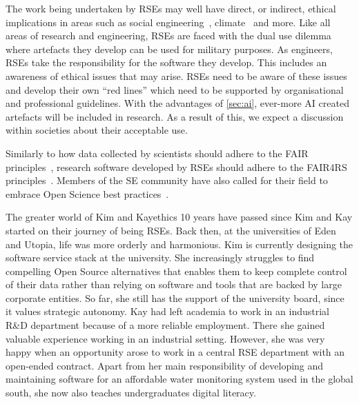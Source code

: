 \documentclass{eceasst}
\begin{document}
The work being undertaken by RSEs may well have direct, or indirect,
ethical implications in areas such as social engineering~\cite{s2erc,Siadati2024},
climate~\cite{Lannelongue2023} and more.
Like all areas of research and engineering, RSEs are faced with the dual use dilemma~\cite{Bobier2024} where artefacts they develop can be used for military purposes.
As engineers, RSEs take the responsibility for the software they develop.
This includes an awareness of ethical issues that may arise.
RSEs need to be aware of these issues and develop their own ``red lines''
which need to be supported by organisational and professional guidelines.
With the advantages of \autoref{sec:ai}, ever-more AI created artefacts will be included in research.
As a result of this, we expect a discussion within societies about their acceptable use.

Similarly to how data collected by scientists should adhere to the FAIR principles~\cite{FAIR},
research software developed by RSEs should adhere to the FAIR4RS principles~\cite{FAIR4RS}.
Members of the SE community have also called for their field to embrace Open Science best practices~\cite{OliveiraJr2024,Druskat2025}.

\begin{story}{The greater world of Kim and Kay}{ethics}
10 years have passed since Kim and Kay started on their journey of being RSEs. Back then,
at the universities of Eden and Utopia, life was more orderly and harmonious.
Kim is currently designing the software service stack at the university.
She increasingly struggles to find compelling Open Source alternatives that enables them to keep complete control of their data
rather than relying on software and tools that are backed by large corporate entities.
So far, she still has the support of the university board, since it values strategic autonomy.
Kay had left academia to work in an industrial R\&D department because of a more reliable employment.
There she gained valuable experience working in an industrial setting.
However, she was very happy when an opportunity arose to work in a central
RSE department with an open-ended contract. Apart from her main responsibility
of developing and maintaining software for an affordable water monitoring system
used in the global south, she now also teaches undergraduates digital literacy.
\end{story}
\vfill
\pagebreak
\end{document}
